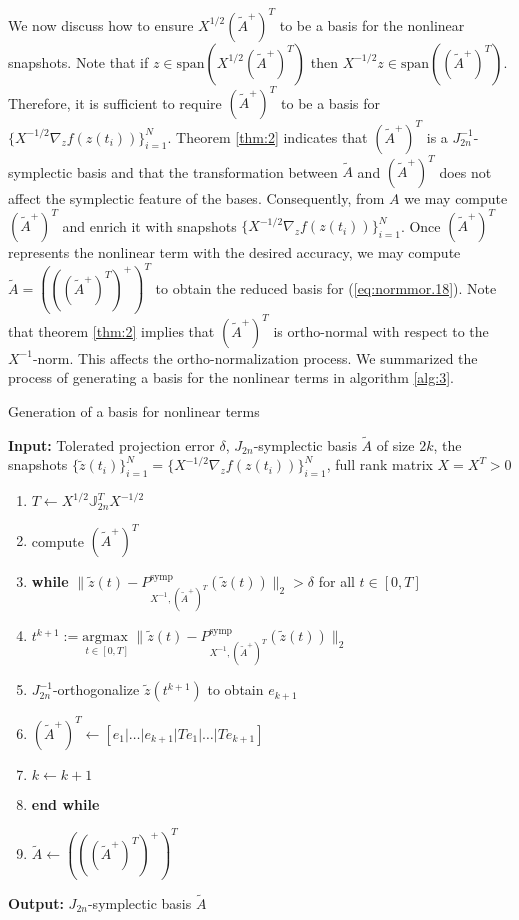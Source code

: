 We now discuss how to ensure $X^{1/2} (\tilde A^+)^T$ to be a basis for the nonlinear snapshots. Note that if $z \in \text{span}\left(X^{1/2} (\tilde A^+)^T\right)$ then $X^{-1/2} z \in \text{span}\left(( \tilde A^+)^T \right)$. Therefore, it is sufficient to require $(\tilde A^+)^T$ to be a basis for $\{X^{-1/2} \nabla_z f(z(t_i))\}_{i=1}^N$. Theorem \ref{thm:2} indicates that $(\tilde A^+)^T$ is a $J_{2n}^{-1}$-symplectic basis and that the transformation between $\tilde A$ and $(\tilde A^+)^T $ does not affect the symplectic feature of the bases. Consequently, from $A$ we may compute $(\tilde A^+)^T$ and enrich it with snapshots $\{X^{-1/2} \nabla_z f(z(t_i))\}_{i=1}^N$. Once $(\tilde A^+)^T$ represents the nonlinear term with the desired accuracy, we may compute $\tilde A= \left( \left( ( \tilde A^+ )^T \right)^+ \right)^T$ to obtain the reduced basis for (\ref{eq:normmor.18}). Note that theorem \ref{thm:2} implies that $(\tilde A^+)^T$ is ortho-normal with respect to the $X^{-1}$-norm. This affects the ortho-normalization process. We summarized the process of generating a basis for the nonlinear terms in algorithm \ref{alg:3}.

\begin{algorithm} 
\caption{Generation of a basis for nonlinear terms} \label{alg:3}
{\bf Input:} Tolerated projection error $\delta$, $J_{2n}$-symplectic basis $\tilde A$ of size $2k$, the snapshots $\{\tilde z(t_i)\}_{i=1}^{N} = \{X^{-1/2} \nabla_zf(z(t_i))\}_{i=1}^{N}$, full rank matrix $X=X^T>0$
\begin{enumerate}
\item $T \leftarrow X^{1/2}\mathbb J_{2n}^T X^{-1/2}$
\item compute $(\tilde A^+)^T$
\item \textbf{while} $\| \tilde z(t) - P^\text{symp}_{X^{-1},(\tilde A^+)^T}( \tilde z(t) ) \|_2 > \delta$ for all $t \in [0,T]$
\item \hspace{0.5cm} $t^{k+1} := \underset{t\in [0,T]}{\text{argmax }} \| \tilde z(t) - P^\text{symp}_{X^{-1},(\tilde A^+)^T}( \tilde z(t) ) \|_2$
\item \hspace{0.5cm} $J_{2n}^{-1}$-orthogonalize $ \tilde z(t^{k+1})$ to obtain $e_{k+1}$
\item \hspace{0.5cm} $(\tilde A^+)^T \leftarrow [e_1|\dots |e_{k+1} | Te_1|\dots| Te_{k+1}]$
\item \hspace{0.5cm} $k \leftarrow k+1$
\item \textbf{end while}
\item $\tilde A \leftarrow \left( \left( ( \tilde A^+ )^T \right)^+ \right)^T$
\end{enumerate}
\vspace{0.5cm}
{\bf Output:} $J_{2n}$-symplectic basis $\tilde A$
\end{algorithm}

